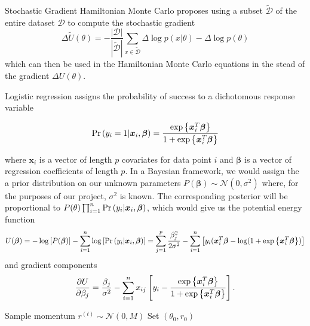 Stochastic Gradient Hamiltonian Monte Carlo proposes using a subset $\tilde{\mathcal{D}}$ of the entire dataset $\mathcal{D}$ to compute the stochastic gradient
\begin{equation*}
	\Delta\tilde{U}(\theta)=-\frac{|\mathcal{D}|}{|\tilde{\mathcal{D}}|}\sum_{x\in\tilde{\mathcal{D}}}\Delta\log p(x|\theta) - \Delta\log p(\theta)
\end{equation*}
which can then be used in the Hamiltonian Monte Carlo equations in the stead of the gradient $\Delta U(\theta)$.

Logistic regression assigns the probability of success to a dichotomous response variable

\begin{equation*}
	\mathrm{Pr}\left(y_i=1|\bm{x}_{i},\bm{\beta}\right)=\frac{\exp\left\lbrace\bm{x}_i^T\bm{\beta} \right\rbrace}{1+\exp\left\lbrace\bm{x}_i^T\bm{\beta} \right\rbrace}
\end{equation*}

where $\bm{x}_i$ is a vector of length $p$ covariates for data point $i$ and $\bm{\beta}$ is a vector of regression coefficients of length $p$. In a Bayesian framework, we would assign the a prior distribution on our unknown parameters $P(\bm{\beta})\sim\mathcal{N}(0, \sigma^2)$ where, for the purposes of our project, $\sigma^2$ is known. The corresponding posterior will be proportional to $P(\theta)\prod_{i=1}^n\mathrm{Pr}\left(y_i|\bm{x}_i,\bm{\beta}\right)$, which would give us the potential energy function
\begin{equation*}
U(\bm{\beta})=-\log\left[P(\bm{\beta})\right] - \sum_{i=1}^n\log\left[\mathrm{Pr}\left(y_i|\bm{x}_i,\bm{\beta}\right)\right]=\sum_{j=1}^p\frac{\beta_j^2}{2\sigma^2}-\sum_{i=1}^n\left[y_i(\bm{x}_i^T\bm{\beta}-\log(1+\exp\left\lbrace\bm{x}_i^T\bm{\beta} \right\rbrace)\right]
\end{equation*}
and gradient components
\begin{equation*}
\frac{\partial U}{\partial \beta_j}=\frac{\beta_j}{\sigma^2}-\sum_{i=1}^{n}x_{ij}\left[y_i-\frac{\exp\left\lbrace\bm{x}_i^T\bm{\beta} \right\rbrace}{1+\exp\left\lbrace\bm{x}_i^T\bm{\beta} \right\rbrace}\right].
\end{equation*}



\begin{algorithm}[H]
		{Sample momentum $r^{(t)}\sim\mathcal{N}(0, M)$\;
		 Set $\left(\theta_0,r_0\right)$}
\end{algorithm}